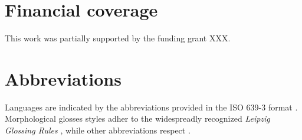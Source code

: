 \documentclass[a4paper,twoside,12pt,chapterprefix=false,listof=flat]{scrartcl}
\theoremstyle{plain} %
\theoremstyle{definition}
\theoremstyle{remark}
\begin{document}
\section*{Financial coverage}\label{financial-coverage}

This work was partially supported by the funding grant XXX.

\section*{Abbreviations}\label{abbreviations}

Languages are indicated by the abbreviations provided in the ISO 639-3
format \citep{iso639-3}. Morphological glosses styles adher to the
widespreadly recognized \emph{Leipzig Glossing Rules}
\citep{leipzigGlossingRules}, while other abbreviations respect
\citep{boeckxListOfAbbreviations}.


\end{document}
